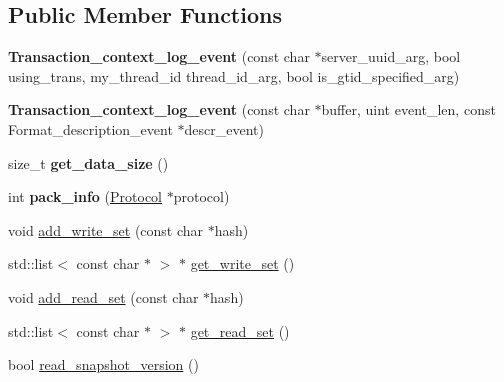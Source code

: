 \subsection*{Public Member Functions}
\begin{DoxyCompactItemize}
\item 
\mbox{\label{classTransaction__context__log__event_a9d09319a8f01964a08b093acbb17d8ef}} 
{\bfseries Transaction\+\_\+context\+\_\+log\+\_\+event} (const char $\ast$server\+\_\+uuid\+\_\+arg, bool using\+\_\+trans, my\+\_\+thread\+\_\+id thread\+\_\+id\+\_\+arg, bool is\+\_\+gtid\+\_\+specified\+\_\+arg)
\item 
\mbox{\label{classTransaction__context__log__event_ae80152ea28103e730abea81ca5112fca}} 
{\bfseries Transaction\+\_\+context\+\_\+log\+\_\+event} (const char $\ast$buffer, uint event\+\_\+len, const Format\+\_\+description\+\_\+event $\ast$descr\+\_\+event)
\item 
\mbox{\label{classTransaction__context__log__event_aed1dccc4300d6d7c3704bbcc8a330637}} 
size\+\_\+t {\bfseries get\+\_\+data\+\_\+size} ()
\item 
\mbox{\label{classTransaction__context__log__event_ab1e98ad96c9cecb4c9dde15f6e152a14}} 
int {\bfseries pack\+\_\+info} (\mbox{\hyperlink{classProtocol}{Protocol}} $\ast$protocol)
\item 
void \mbox{\hyperlink{classTransaction__context__log__event_a2f9e55762a33d63feb95604054c7d774}{add\+\_\+write\+\_\+set}} (const char $\ast$hash)
\item 
std\+::list$<$ const char $\ast$ $>$ $\ast$ \mbox{\hyperlink{classTransaction__context__log__event_ac32b9a6a93a80e8a5e286d4b4ee0cbb1}{get\+\_\+write\+\_\+set}} ()
\item 
void \mbox{\hyperlink{classTransaction__context__log__event_a436a05a16845aff723f8422ecacc39d2}{add\+\_\+read\+\_\+set}} (const char $\ast$hash)
\item 
std\+::list$<$ const char $\ast$ $>$ $\ast$ \mbox{\hyperlink{classTransaction__context__log__event_a50e7d23deff3a573ac9816d4e450b8a5}{get\+\_\+read\+\_\+set}} ()
\item 
bool \mbox{\hyperlink{classTransaction__context__log__event_a8f7b4b4b8d639ab385cf41f80ec3171f}{read\+\_\+snapshot\+\_\+version}} ()

\end{DoxyCompactItemize}
